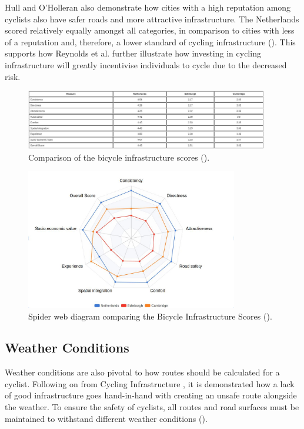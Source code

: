 Hull and O'Holleran also demonstrate how cities with a high reputation among cyclists also have safer roads and more attractive infrastructure. The Netherlands scored relatively equally amongst all categories, in comparison to cities with less of a reputation and, therefore, a lower standard of cycling infrastructure   (\cite{hull_bicycle_2014}). This supports how Reynolds et al. further illustrate how investing in cycling infrastructure will greatly incentivise individuals to cycle due to the decreased risk. 

\begin{figure}
    \centering
    \includegraphics[width=400px, keepaspectratio]{figures/bicycle_infrastructure_score_table.jpg}
    \caption{Comparison of the bicycle infrastructure scores (\cite{hull_bicycle_2014}).}
    \label{fig:bicycleinfrastructurescorestable}
\end{figure}

\begin{figure}
    \centering
    \includegraphics[width=350px, keepaspectratio]{figures/bicycle_infrastructure_scores.jpg}
    \caption{Spider web diagram comparing the Bicycle Infrastructure Scores (\cite{hull_bicycle_2014}).}
    \label{fig:bicycleinfrastructurescores}
\end{figure}

\subsection{Weather Conditions}
\label{litrev:weatherconditions}
Weather conditions are also pivotal to how routes should be calculated for a cyclist. Following on from Cycling Infrastructure , it is demonstrated how a lack of good infrastructure goes hand-in-hand with creating an unsafe route alongside the weather. To ensure the safety of cyclists, all routes and road surfaces must be maintained to withstand different weather conditions (\cite{shoman_evaluation_2023}).

